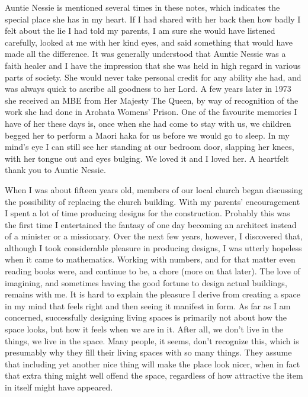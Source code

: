 Auntie Nessie is mentioned several times in these notes, which indicates
the special place she has in my heart. If I had shared with her back
then how badly I felt about the lie I had told my parents, I am sure she
would have listened carefully, looked at me with her kind eyes, and said
something that would have made all the difference. It was generally
understood that Auntie Nessie was a faith healer and I have the
impression that she was held in high regard in various parts of society.
She would never take personal credit for any ability she had, and was
always quick to ascribe all goodness to her Lord. A few years later in
1973 she received an MBE from Her Majesty The Queen, by way of
recognition of the work she had done in Arohata Womens' Prison. One of
the favourite memories I have of her these days is, once when she had
come to stay with us, we children begged her to perform a Maori haka\cite{haka}
for us before we would go to sleep. In
my mind's eye I can still see her standing at our bedroom door, slapping
her knees, with her tongue out and eyes bulging. We loved it and I loved
her. A heartfelt thank you to Auntie Nessie.

When I was about fifteen years old, members of our local church began
discussing the possibility of replacing the church building. With my
parents' encouragement I spent a lot of time producing designs for the
construction. Probably this was the first time I entertained the fantasy
of one day becoming an architect instead of a minister or a missionary.
Over the next few years, however, I discovered that, although I took
considerable pleasure in producing designs, I was utterly hopeless when
it came to mathematics. Working with numbers, and for that matter even
reading books were, and continue to be, a chore (more on that later).
The love of imagining, and sometimes having the good fortune to design
actual buildings, remains with me. It is hard to explain the pleasure I
derive from creating a space in my mind that feels right and then seeing
it manifest in form. As far as I am concerned, successfully designing
living spaces is primarily not about how the space looks, but how it
feels when we are in it. After all, we don't live in the things, we live
in the space. Many people, it seems, don't recognize this, which is
presumably why they fill their living spaces with so many things. They
assume that including yet another nice thing will make the place look
nicer, when in fact that extra thing might well offend the space,
regardless of how attractive the item in itself might have appeared.

